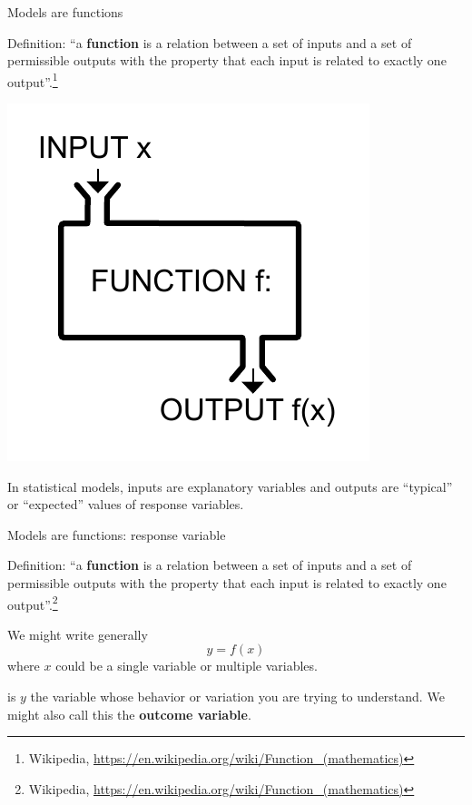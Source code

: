 \documentclass[table]{beamer}\usepackage[]{graphicx}\usepackage[]{color}
\begin{document}

\begin{frame}[fragile]{Models are functions}

Definition: ``a {\bf function} is a relation between a set of inputs and a set of permissible outputs with the property that each input is related to exactly one output''.\footnote{Wikipedia, \href{https://en.wikipedia.org/wiki/Function_(mathematics)}{https://en.wikipedia.org/wiki/Function\_(mathematics)}}

\includegraphics[width=.5\textwidth]{figure-static/Function_machine2}

In statistical models, inputs are explanatory variables and outputs are ``typical'' or ``expected'' values of response variables. %



\end{frame}



\begin{frame}[fragile]{Models are functions: response variable}

Definition: ``a {\bf function} is a relation between a set of inputs and a set of permissible outputs with the property that each input is related to exactly one output''.\footnote{Wikipedia, \href{https://en.wikipedia.org/wiki/Function_(mathematics)}{https://en.wikipedia.org/wiki/Function\_(mathematics)}}

\vspace{2em}



We might write generally $$ y = f(x)$$ where $x$ could be a single variable or multiple variables.

\vspace{1em}

\bi
   is $y$ the variable whose behavior or variation you are trying to understand. We might also call this the {\bf outcome variable}.
\ei

\end{frame}
\end{document}
